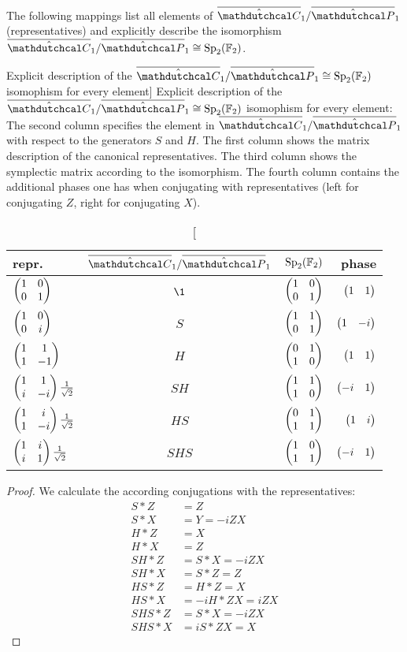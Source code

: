\documentclass[a4paper,english]{scrartcl}
\begin{document}
\begin{proposition}
The following mappings list all elements of $\ouic_1/\ouip_1$ (representatives) and
explicitly describe the isomorphism $\ouic_1/\ouip_1 \cong \Sp_{2}\w(\F_2)$.
\begin{table}[H]\label{t"single_qubit_isomorphism}
\center
\caption
[Explicit description of the $\ouic_1/\ouip_1 \cong \Sp_{2}\w(\F_2)$ isomophism for
every element]
{Explicit description of the $\ouic_1/\ouip_1 \cong \Sp_{2}\w(\F_2)$ isomophism for every
element: The second column specifies the element in $\ouic_1/\ouip_1$ with respect to
the generators $S$ and $H$. The first column shows the matrix description of the
canonical representatives. The third column shows the symplectic matrix according to the
isomorphism. The fourth column contains the additional phases one has when conjugating
with representatives (left for conjugating $Z$, right for conjugating $X$).}
\begin{tabular}{lccr}
  \toprule
  repr. & $\ouic_1/\ouip_1$ & $\Sp_{2}\w(\F_2)$ & phase\\
  \midrule
  $\begin{pmatrix}1&0\\0&1\end{pmatrix}$ & $\1$ & $\begin{pmatrix}1&0\\0&1\end{pmatrix}$ & $\begin{pmatrix}1&1\end{pmatrix}$\\
  \midrule
  $\begin{pmatrix}1&0\\0&i\end{pmatrix}$ & $S$ & $\begin{pmatrix}1&1\\0&1\end{pmatrix}$ & $\begin{pmatrix}1&-i\end{pmatrix}$\\
  \midrule
  $\begin{pmatrix}1&1\\1&-1\end{pmatrix}$ & $H$ & $\begin{pmatrix}0&1\\1&0\end{pmatrix}$ & $\begin{pmatrix}1&1\end{pmatrix}$\\
  \midrule
  $\begin{pmatrix}1&1\\i&-i\end{pmatrix}\frac{1}{\sqrt{2}}$ & $SH$ & $\begin{pmatrix}1&1\\1&0\end{pmatrix}$ & $\begin{pmatrix}-i&1\end{pmatrix}$\\
  \midrule
  $\begin{pmatrix}1&i\\1&-i\end{pmatrix}\frac{1}{\sqrt{2}}$ & $HS$ & $\begin{pmatrix}0&1\\1&1\end{pmatrix}$ & $\begin{pmatrix}1&i\end{pmatrix}$\\
  \midrule
  $\begin{pmatrix}1&i\\i&1\end{pmatrix}\frac{1}{\sqrt{2}}$ & $SHS$ & $\begin{pmatrix}1&0\\1&1\end{pmatrix}$ & $\begin{pmatrix}-i&1\end{pmatrix}$\\
  \bottomrule
\end{tabular}
\end{table}
\end{proposition}
\begin{proof}
We calculate the according conjugations with the representatives:
\begin{align}
  S*Z &= Z\\
  S*X &= Y = -iZX\\
  H*Z &= X\\
  H*X &= Z\\
  SH*Z &= S*X = -iZX\\
  SH*X &= S*Z = Z\\
  HS*Z &= H*Z = X\\
  HS*X &= -iH*ZX = iZX\\
  SHS*Z &= S*X = -iZX\\
  SHS*X &= iS*ZX = X
\end{align}
\end{proof}
\end{document}
